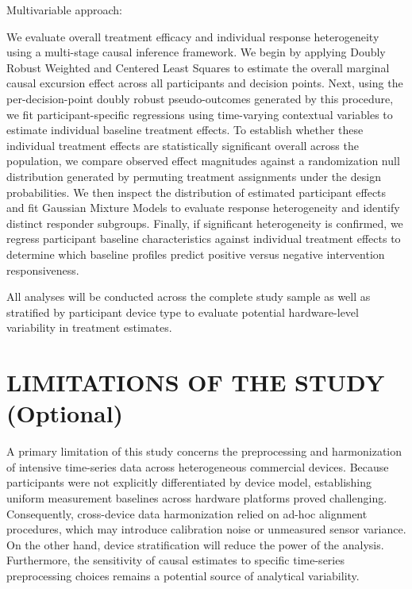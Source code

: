 \documentclass[11pt,letterpaper]{article}
\begin{document}
\vspace{1.5em}

Multivariable approach:

We evaluate overall treatment efficacy and individual response heterogeneity using a multi-stage causal inference framework.
We begin by applying Doubly Robust Weighted and Centered Least Squares to estimate the overall marginal causal excursion effect across all participants and decision points.
Next, using the per-decision-point doubly robust pseudo-outcomes generated by this procedure, we fit participant-specific regressions using time-varying contextual variables to estimate individual baseline treatment effects.
To establish whether these individual treatment effects are statistically significant overall across the population, we compare observed effect magnitudes against a randomization null distribution generated by permuting treatment assignments under the design probabilities.
We then inspect the distribution of estimated participant effects and fit Gaussian Mixture Models to evaluate response heterogeneity and identify distinct responder subgroups.
Finally, if significant heterogeneity is confirmed, we regress participant baseline characteristics against individual treatment effects to determine which baseline profiles predict positive versus negative intervention responsiveness.

All analyses will be conducted across the complete study sample as well as stratified by participant device type to evaluate potential hardware-level variability in treatment estimates.

\vspace{1.5em}

\section{LIMITATIONS OF THE STUDY (Optional)}
A primary limitation of this study concerns the preprocessing and harmonization of intensive time-series data across heterogeneous commercial devices.
Because participants were not explicitly differentiated by device model, establishing uniform measurement baselines across hardware platforms proved challenging.
Consequently, cross-device data harmonization relied on ad-hoc alignment procedures, which may introduce calibration noise or unmeasured sensor variance.
On the other hand, device stratification will reduce the power of the analysis.
Furthermore, the sensitivity of causal estimates to specific time-series preprocessing choices remains a potential source of analytical variability.
\end{document}
